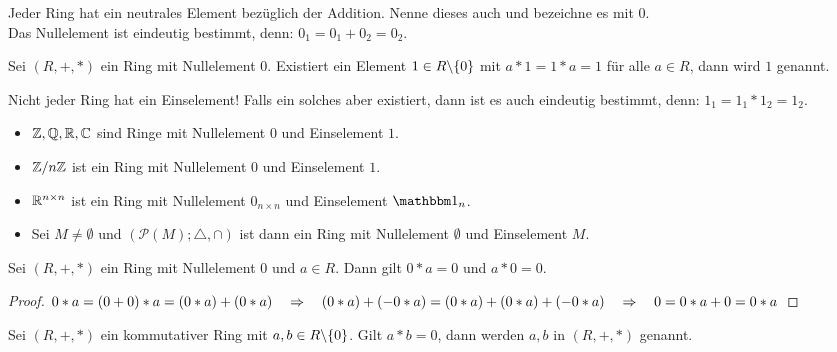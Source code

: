 %
\begin{bem}
	Jeder Ring hat ein neutrales Element bezüglich der Addition. Nenne dieses auch  und bezeichne es mit $0$. \\
	Das Nullelement ist eindeutig bestimmt, denn: $0_1 = 0_1 + 0_2 = 0_2$.
\end{bem}
%
\begin{defin}
	Sei $(R,+,*)$ ein Ring mit Nullelement $0$. Existiert ein Element $1 \in R \backslash \{ 0 \}$ mit $a*1 = 1*a = 1$ für alle $a \in R$, dann wird $1$  genannt.
\end{defin}
%
\begin{bem}
	Nicht jeder Ring hat ein Einselement! Falls ein solches aber existiert, dann ist es auch eindeutig bestimmt, denn: $1_1 = 1_1 * 1_2 = 1_2$.
\end{bem}
%
\begin{bsp}
	\begin{itemize}
		\item $\mathbb{Z}, \mathbb{Q}, \mathbb{R}, \mathbb{C}$ sind Ringe mit Nullelement $0$ und Einselement $1$.
		\item $\mathbb{Z} / n \mathbb{Z}$ ist ein Ring mit Nullelement $0$ und Einselement $1$.
		\item $\mathbb{R}^{n \times n}$ ist ein Ring mit Nullelement $0_{n \times n}$ und Einselement $\one_n$.
		\item Sei $M \neq \emptyset$ und $(\mathcal{P}(M); \triangle, \cap)$ ist dann ein Ring mit Nullelement $\emptyset$ und Einselement $M$.
	\end{itemize}
\end{bsp}
%
\begin{bem}
	Sei $(R,+,*)$ ein Ring mit Nullelement $0$ und $a \in R$. Dann gilt $0 * a = 0$ und $a * 0 = 0$.
\end{bem}
\begin{proof}
	$0*a = (0 + 0)*a = (0 * a) + (0 * a) \quad \Rightarrow \quad (0*a) + (-0*a) = (0*a) + (0*a) + (-0*a) \quad \Rightarrow \quad 0 = 0*a + 0 = 0*a$
\end{proof}
%
\begin{defin}
	Sei $(R,+,*)$ ein kommutativer Ring mit $a,b \in R \backslash \{ 0 \}$. Gilt $a*b = 0$, dann werden $a,b$  in $(R,+,*)$ genannt.
\end{defin}
%
